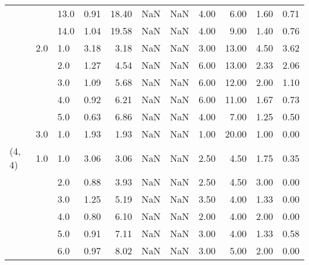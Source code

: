 \begin{tabular}{lllrrrrrrrr}
       &     & 13.0 &      0.91 &      18.40 &               NaN &                NaN & 4.00 &   6.00 &             1.60 &                         0.71 \\
       &     & 14.0 &      1.04 &      19.58 &               NaN &                NaN & 4.00 &   9.00 &             1.40 &                         0.76 \\
       & 2.0 & 1.0  &      3.18 &       3.18 &               NaN &                NaN & 3.00 &  13.00 &             4.50 &                         3.62 \\
       &     & 2.0  &      1.27 &       4.54 &               NaN &                NaN & 6.00 &  13.00 &             2.33 &                         2.06 \\
       &     & 3.0  &      1.09 &       5.68 &               NaN &                NaN & 6.00 &  12.00 &             2.00 &                         1.10 \\
       &     & 4.0  &      0.92 &       6.21 &               NaN &                NaN & 6.00 &  11.00 &             1.67 &                         0.73 \\
       &     & 5.0  &      0.63 &       6.86 &               NaN &                NaN & 4.00 &   7.00 &             1.25 &                         0.50 \\
       & 3.0 & 1.0  &      1.93 &       1.93 &               NaN &                NaN & 1.00 &  20.00 &             1.00 &                         0.00 \\
(4, 4) & 1.0 & 1.0  &      3.06 &       3.06 &               NaN &                NaN & 2.50 &   4.50 &             1.75 &                         0.35 \\
       &     & 2.0  &      0.88 &       3.93 &               NaN &                NaN & 2.50 &   4.50 &             3.00 &                         0.00 \\
       &     & 3.0  &      1.25 &       5.19 &               NaN &                NaN & 3.50 &   4.00 &             1.33 &                         0.00 \\
       &     & 4.0  &      0.80 &       6.10 &               NaN &                NaN & 2.00 &   4.00 &             2.00 &                         0.00 \\
       &     & 5.0  &      0.91 &       7.11 &               NaN &                NaN & 3.00 &   4.00 &             1.33 &                         0.58 \\
       &     & 6.0  &      0.97 &       8.02 &               NaN &                NaN & 3.00 &   5.00 &             2.00 &                         0.00 \\

\end{tabular}
